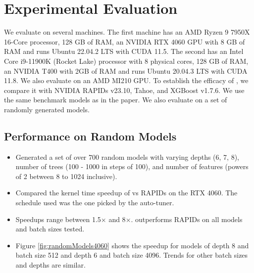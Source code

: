 \section{Experimental Evaluation}
\label{sec:results}

We evaluate \Treebeard{} on several machines. The first machine has an AMD Ryzen 9 7950X 16-Core processor,
128 GB of RAM, an NVIDIA RTX 4060 GPU with 8 GB of RAM and runs Ubuntu 22.04.2 LTS with CUDA 11.5. The 
second has an Intel Core i9-11900K (Rocket Lake) processor with 8 physical cores, 128 GB of RAM, an 
NVIDIA T400 with 2GB of RAM and runs Ubuntu 20.04.3 LTS with CUDA 11.8. We also evaluate \Treebeard{} on 
an AMD MI210 GPU. To establish the efficacy of \Treebeard{}, we compare it with NVIDIA RAPIDs v23.10,
Tahoe, and XGBoost v1.7.6. We use the same benchmark models as in the \TreebeardOLD{} paper\cite{Treebeard}.
We also evaluate \Treebeard{} on a set of randomly generated models.

\subsection{Performance on Random Models}
\begin{itemize}
  \item Generated a set of over 700 random models with varying depths (6, 7, 8), number of trees (100 - 1000 in steps of 100), 
  and number of features (powers of 2 between 8 to 1024 inclusive).
  \item Compared the kernel time speedup of \Treebeard{} vs RAPIDs on the RTX 4060. The schedule used was the one picked by the auto-tuner. 
  \item Speedups range between 1.5$\times$ and 8$\times$. \Treebeard{} outperforms RAPIDs on all models and batch sizes tested.
  \item Figure \ref{fig:randomModels4060} shows the speedup for models of depth 8 and batch size 512 and depth 6 and batch size 4096.
  Trends for other batch sizes and depths are similar.
\end{itemize}

